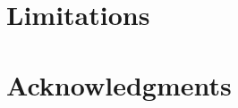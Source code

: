 \documentclass[11pt]{article}
\begin{document}



\section*{Limitations}

\section*{Acknowledgments}

%


\appendix
\end{document}
